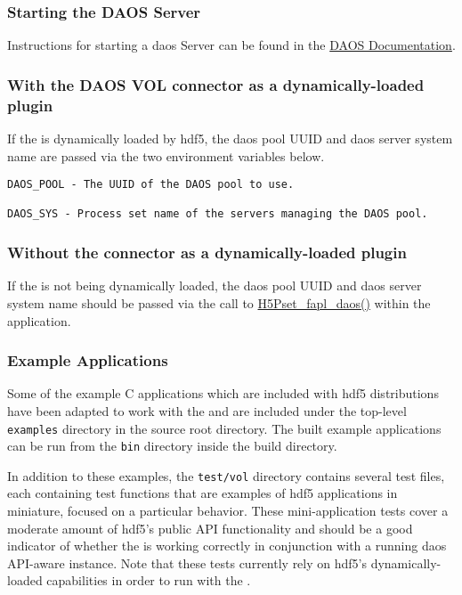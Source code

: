 \documentclass[../users_guide.tex]{subfiles}
\begin{document}
\subsubsection{Starting the DAOS Server}
\label{sec:daos_serv_start}

Instructions for starting a \acrshort{daos} Server can be found in the \href{https://daos-stack.github.io/admin/deployment/#server-startup}{DAOS Documentation}.

\subsubsection{With the DAOS VOL connector as a dynamically-loaded plugin}

If the \dvc{} is dynamically loaded by \acrshort{hdf5}, the \acrshort{daos} pool UUID and
\acrshort{daos} server system name are passed via the two environment variables below.

\begin{verbatim}
DAOS_POOL - The UUID of the DAOS pool to use.

DAOS_SYS - Process set name of the servers managing the DAOS pool.
\end{verbatim}

\subsubsection{Without the connector as a dynamically-loaded plugin}

If the \dvc{} is not being dynamically loaded, the \acrshort{daos} pool UUID
and \acrshort{daos} server system name should be passed via the call to
\hyperref[ref:h5pset_fapl_daos]{H5Pset\_fapl\_daos()} within the application.

\subsubsection{Example Applications}

Some of the example C applications which are included with \acrshort{hdf5}
distributions have been adapted to work with the \dvc{} and are included under
the top-level \texttt{examples} directory in the \dvc{} source root directory.
The built example applications can be run from the \texttt{bin} directory inside the build directory.

In addition to these examples, the \texttt{test/vol} directory contains several test
files, each containing test functions that are examples of \acrshort{hdf5} applications in
miniature, focused on a particular behavior. These mini-application tests cover a moderate 
amount of \acrshort{hdf5}'s public API functionality and should be a good indicator of
whether the \dvc{} is working correctly in conjunction with a
running \acrshort{daos} API-aware instance. Note that these tests currently rely on \acrshort{hdf5}'s
dynamically-loaded \vc{} capabilities in order to run with the \dvc{}.
\end{document}
